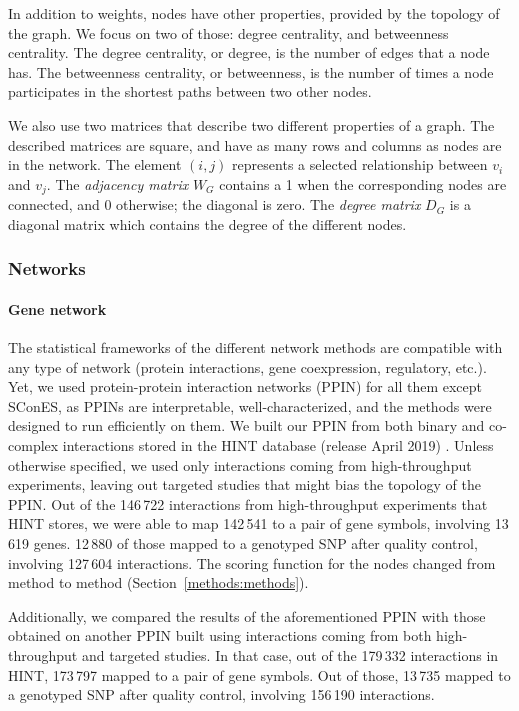 \documentclass[10pt,letterpaper]{article}
\begin{document}
In addition to weights, nodes have other properties, provided by the topology of the graph. We focus on two of those: degree centrality, and betweenness centrality. The degree centrality, or degree, is the number of edges that a node has. The betweenness centrality, or betweenness, is the number of times a node participates in the shortest paths between two other nodes.

We also use two matrices that describe two different properties of a graph. The described matrices are square, and have as many rows and columns as nodes are in the network. The element $(i,j)$ represents a  selected relationship between $v_i$ and $v_j$. The \emph{adjacency matrix} $W_G$ contains a 1 when the corresponding nodes are connected, and 0 otherwise; the diagonal is zero. The \emph{degree matrix} $D_G$ is a diagonal matrix which contains the degree of the different nodes.

\subsubsection{Networks}
\label{methods:networks}

\paragraph{Gene network}
The statistical frameworks of the different network methods are compatible with any type of network (protein interactions, gene coexpression, regulatory, etc.). Yet, we used protein-protein interaction networks (PPIN) for all them except SConES, as PPINs are interpretable, well-characterized, and the methods were designed to run efficiently on them. We built our PPIN from both binary and co-complex interactions stored in the HINT database (release April 2019) \cite{das_hint:_2012}. Unless otherwise specified, we used only interactions coming from high-throughput experiments, leaving out targeted studies that might bias the topology of the PPIN. Out of the 146\,722 interactions from high-throughput experiments that HINT stores, we were able to map 142\,541 to a pair of gene symbols, involving 13\,619 genes. 12\,880 of those mapped to a genotyped SNP after quality control, involving 127\,604 interactions. The scoring function for the nodes changed from method to method (Section~\ref{methods:methods}).

Additionally, we compared the results of the aforementioned PPIN with those obtained on another PPIN built using interactions coming from both high-throughput and targeted studies. In that case, out of the 179\,332 interactions in HINT, 173\,797 mapped to a pair of gene symbols. Out of those, 13\,735 mapped to a genotyped SNP after quality control, involving 156\,190 interactions.
\end{document}
